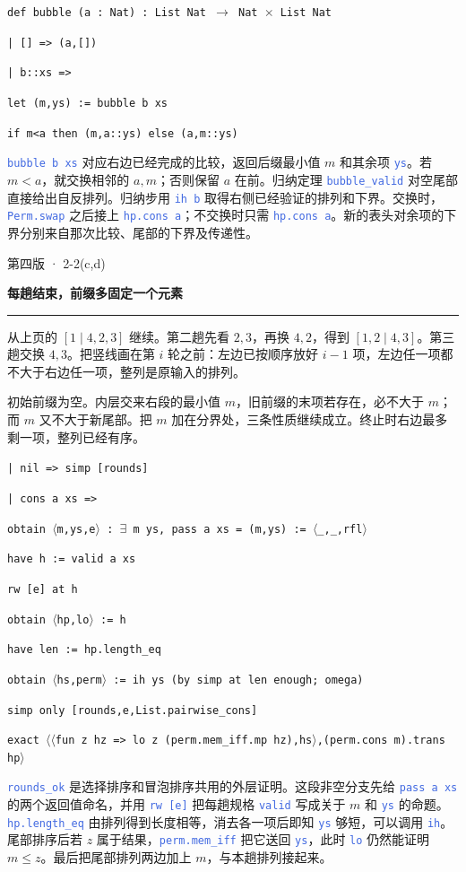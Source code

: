 \documentclass[UTF8,11pt,a4paper,fontset=fandol]{ctexart}
\newcommand{\HandoutLesson}[2]{%
  \par{\small\heiti\color{BrickRed}#1}\par\vspace{3pt}
  {\fontsize{21}{27}\selectfont\heiti\bfseries #2}\par
  \textcolor{BrickRed}{\rule{\linewidth}{.7pt}}\par}
\newcommand{\src}[1]{\textcolor{RoyalBlue}{\texttt{#1}}}
\newcommand{\subhead}[1]{\par\vspace{3pt}{\heiti\bfseries\color{RoyalBlue}#1}\par}
\newenvironment{leanblock}{\par\smallskip\noindent\begin{lrbox}{\leanbox}\begin{minipage}{\dimexpr\linewidth-12pt\relax}\raggedright\small\setlength{\parskip}{0pt}}{\end{minipage}\end{lrbox}\colorbox{RoyalBlue!6}{\usebox{\leanbox}}\par\smallskip}
\newcommand{\lineofcode}[2]{\noindent\hspace*{#1em}\strut\texttt{#2}\par}
\begin{document}
\begin{leanblock}
\lineofcode{0.0}{def bubble (a : Nat) : List Nat \ensuremath{\to} Nat \ensuremath{\times} List Nat}
\lineofcode{0.9}{| [] => (a,[])}
\lineofcode{0.9}{| b::xs =>}
\lineofcode{1.8}{let (m,ys) := bubble b xs}
\lineofcode{1.8}{if m<a then (m,a::ys) else (a,m::ys)}
\end{leanblock}
\src{bubble b xs} 对应右边已经完成的比较，返回后缀最小值 $m$ 和其余项 \src{ys}。若 $m<a$，就交换相邻的 $a,m$；否则保留 $a$ 在前。归纳定理 \src{bubble\_valid} 对空尾部直接给出自反排列。归纳步用 \src{ih b} 取得右侧已经验证的排列和下界。交换时，\src{Perm.swap} 之后接上 \src{hp.cons a}；不交换时只需 \src{hp.cons a}。新的表头对余项的下界分别来自那次比较、尾部的下界及传递性。
\par{}
\clearpage{}\label{p44}\HandoutLesson{第四版 · 2-2(c,d)}{每趟结束，前缀多固定一个元素}
从上页的 $[1\mid4,2,3]$ 继续。第二趟先看 $2,3$，再换 $4,2$，得到 $[1,2\mid4,3]$。第三趟交换 $4,3$。把竖线画在第 $i$ 轮之前：左边已按顺序放好 $i-1$ 项，左边任一项都不大于右边任一项，整列是原输入的排列。
\subhead{(c) 把内层终止条件交给外层}
初始前缀为空。内层交来右段的最小值 $m$，旧前缀的末项若存在，必不大于 $m$；而 $m$ 又不大于新尾部。把 $m$ 加在分界处，三条性质继续成立。终止时右边最多剩一项，整列已经有序。
\begin{leanblock}
\lineofcode{1.8}{| nil => simp [rounds]}
\lineofcode{1.8}{| cons a xs =>}
\lineofcode{2.7}{obtain \ensuremath{\langle}m,ys,e\ensuremath{\rangle} : \ensuremath{\exists} m ys, pass a xs = (m,ys) := \ensuremath{\langle}\_,\_,rfl\ensuremath{\rangle}}
\lineofcode{2.7}{have h := valid a xs}
\lineofcode{2.7}{rw [e] at h}
\lineofcode{2.7}{obtain \ensuremath{\langle}hp,lo\ensuremath{\rangle} := h}
\lineofcode{2.7}{have len := hp.length\_eq}
\lineofcode{2.7}{obtain \ensuremath{\langle}hs,perm\ensuremath{\rangle} := ih ys (by simp at len enough; omega)}
\lineofcode{2.7}{simp only [rounds,e,List.pairwise\_cons]}
\lineofcode{2.7}{exact \ensuremath{\langle}\ensuremath{\langle}fun z hz => lo z (perm.mem\_iff.mp hz),hs\ensuremath{\rangle},(perm.cons m).trans hp\ensuremath{\rangle}}
\end{leanblock}
\src{rounds\_ok} 是选择排序和冒泡排序共用的外层证明。这段非空分支先给 \src{pass a xs} 的两个返回值命名，并用 \src{rw [e]} 把每趟规格 \src{valid} 写成关于 $m$ 和 \src{ys} 的命题。\src{hp.length\_eq} 由排列得到长度相等，消去各一项后即知 \src{ys} 够短，可以调用 \src{ih}。尾部排序后若 $z$ 属于结果，\src{perm.mem\_iff} 把它送回 \src{ys}，此时 \src{lo} 仍然能证明 $m\le z$。最后把尾部排列两边加上 $m$，与本趟排列接起来。
\end{document}
